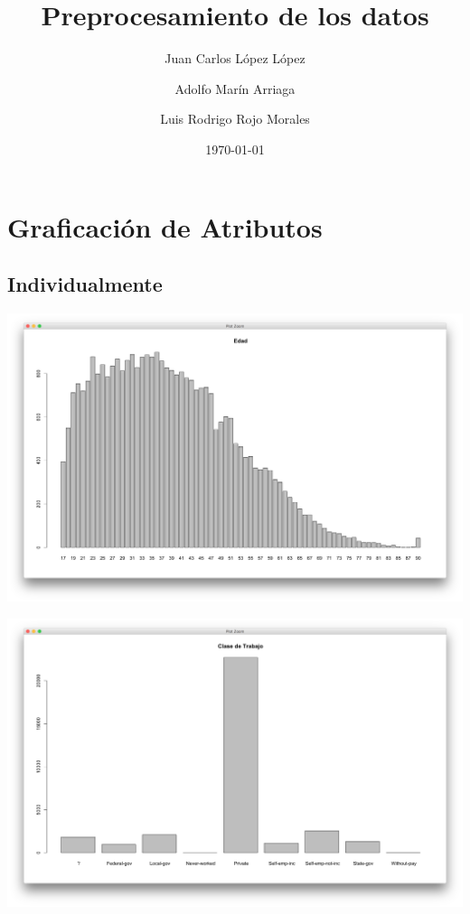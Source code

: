 \documentclass{article}
\title{Preprocesamiento de los datos}
\author{Juan Carlos López López \and Adolfo Marín Arriaga \and Luis Rodrigo Rojo Morales}
\date{\today\\}
\begin{document}
 \maketitle
 \section{Graficación de Atributos}
 \subsection{Individualmente}
 \begin{center}
   \hbox{\hspace{-5.8em}\includegraphics[scale=0.4]{graficas/edad}}
 \end{center}
 \begin{center}
   \hbox{\hspace{-5.8em}\includegraphics[scale=0.4]{graficas/claseDeTrabajo}}
 \end{center}
\end{document}
